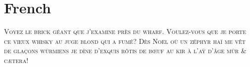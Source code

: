 
\presection\section*{\checkyes French}\postsection

\noindent\textsc{Voyez le brick géant que j’examine près du wharf.
Voulez-vous que je porte ce vieux whisky au juge blond qui a fumé\medspace?
Dès Noël où un zéphyr haï me vêt de glaçons würmiens 
je dîne d’exquis rôtis de bœuf au kir à l’aÿ d’âge mûr \& cætera\medspace!}